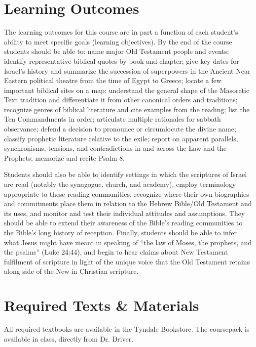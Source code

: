 \documentclass[titlepage]{article}
\newcommand\incl{../includes}
\begin{document}


\section{Learning Outcomes}
\label{outcomes}

The learning outcomes for this course are in part a function of each
student's ability to meet specific goals (learning objectives). By the
end of the course students should be able to:
	name major Old Testament people and events;
	identify representative biblical quotes by book and chapter;
	give key dates for Israel's history and summarize the succession of superpowers in the Ancient Near Eastern political theatre from the time of Egypt to Greece;
	locate a few important biblical sites on a map;
	understand the general shape of the Masoretic Text tradition and differentiate it from other canonical orders and traditions;
	recognize genres of biblical literature and cite examples from the reading;
	list the Ten Commandments in order;
	articulate multiple rationales for sabbath observance;
	defend a decision to pronounce or circumlocute the divine name;
	classify prophetic literature relative to the exile;
	report on apparent parallels, synchronisms, tensions, and contradictions in and across the Law and the Prophets;
	memorize and recite Psalm 8.

Students should also be able to identify settings in which the
scriptures of Israel are read (notably the synagogue, church, and
academy), employ terminology appropriate to these reading communities,
recognize where their own biographies and commitments place them in
relation to the Hebrew Bible/Old Testament and its uses, and monitor and
test their individual attitudes and assumptions. They should be able to
extend their awareness of the Bible's reading communities to the Bible's
long history of reception. Finally, students should be able to infer
what Jesus might have meant in speaking of ``the law of Moses, the
prophets, and the psalms'' (Luke 24:44), and begin to hear claims about
New Testament fulfilment of scripture in light of the unique voice that
the Old Testament retains along side of the New in Christian scripture.

\section{Required Texts \& Materials}
\label{texts}

All required textbooks are available in the Tyndale Bookstore. The
coursepack is available in class, directly from Dr. Driver.
\end{document}
